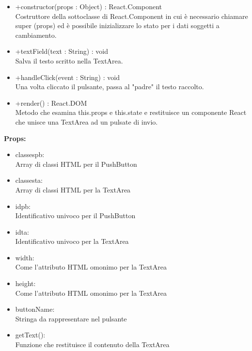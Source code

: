 \begin{itemize}

\item +constructor(props : Object) : React.Component 
\\
Costruttore della sottoclasse di React.Component in cui è necessario chiamare super (props) ed è possibile inizializzare lo stato per i dati soggetti a cambiamento.

\item +textField(text : String) : void 
\\
Salva il testo scritto nella TextArea.

\item +handleClick(event : String) : void  
\\
Una volta cliccato il pulsante, passa al "padre" il testo raccolto. 

\item +render() : React.DOM 
\\
Metodo che esamina this.props e this.state e restituisce un componente React che unisce una TextArea ad un pulsate di invio.

\end{itemize}


\textbf{Props:} 
\begin{itemize}
\item classespb: 
\\
Array di classi HTML per il PushButton
\item classesta: 
\\
Array di classi HTML per la TextArea
\item idpb: 
\\
Identificativo univoco per il PushButton
\item idta: 
\\
Identificativo univoco per la TextArea
\item width: 
\\
Come l'attributo HTML omonimo per la TextArea
\item height: 
\\
Come l'attributo HTML omonimo per la TextArea
\item buttonName: 
\\
Stringa da rappresentare nel pulsante
\item getText(): 
\\
Funzione che restituisce il contenuto della TextArea



\end{itemize} 



